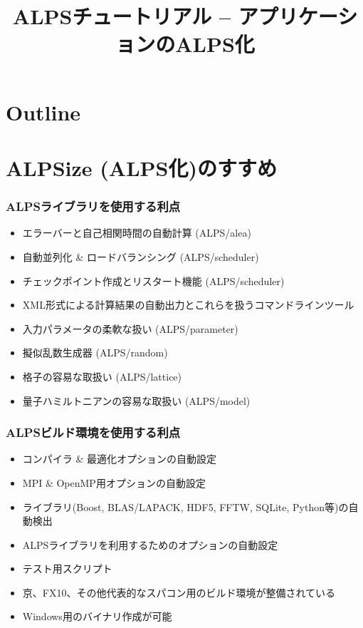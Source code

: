 \title{ALPSチュートリアル -- アプリケーションのALPS化}




\begin{frame}
  \titlepage
\end{frame}

\section*{Outline}
\begin{frame}
  \tableofcontents
\end{frame}

\section{ALPSize (ALPS化)のすすめ}
\begin{frame}
  \frametitle{ALPSライブラリを使用する利点}
  \begin{itemize}
  \item エラーバーと自己相関時間の自動計算 (ALPS/alea)
  \item 自動並列化 \& ロードバランシング (ALPS/scheduler)
  \item チェックポイント作成とリスタート機能 (ALPS/scheduler)
  \item XML形式による計算結果の自動出力とこれらを扱うコマンドラインツール
  \item 入力パラメータの柔軟な扱い (ALPS/parameter)
  \item 擬似乱数生成器 (ALPS/random)
  \item 格子の容易な取扱い (ALPS/lattice)
  \item 量子ハミルトニアンの容易な取扱い (ALPS/model)
  \end{itemize}
\end{frame}

\begin{frame}
  \frametitle{ALPSビルド環境を使用する利点}
  \begin{itemize}
  \item コンパイラ \& 最適化オプションの自動設定
  \item MPI \& OpenMP用オプションの自動設定
  \item ライブラリ(Boost, BLAS/LAPACK, HDF5, FFTW, SQLite, Python等)の自動検出
  \item ALPSライブラリを利用するためのオプションの自動設定
  \item テスト用スクリプト
  \item 京、FX10、その他代表的なスパコン用のビルド環境が整備されている
  \item Windows用のバイナリ作成が可能
  \end{itemize}
\end{frame}

